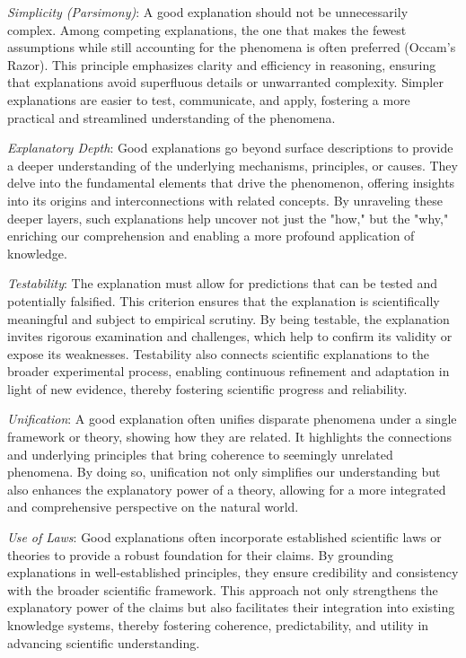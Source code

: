 \emph{Simplicity (Parsimony)}: A good explanation should not be unnecessarily complex. Among competing explanations, the one that makes the fewest assumptions while still accounting for the phenomena is often preferred (Occam’s Razor). This principle emphasizes clarity and efficiency in reasoning, ensuring that explanations avoid superfluous details or unwarranted complexity. Simpler explanations are easier to test, communicate, and apply, fostering a more practical and streamlined understanding of the phenomena.

\emph{Explanatory Depth}: Good explanations go beyond surface descriptions to provide a deeper understanding of the underlying mechanisms, principles, or causes. They delve into the fundamental elements that drive the phenomenon, offering insights into its origins and interconnections with related concepts. By unraveling these deeper layers, such explanations help uncover not just the "how," but the "why," enriching our comprehension and enabling a more profound application of knowledge.

\emph{Testability}: The explanation must allow for predictions that can be tested and potentially falsified. This criterion ensures that the explanation is scientifically meaningful and subject to empirical scrutiny. By being testable, the explanation invites rigorous examination and challenges, which help to confirm its validity or expose its weaknesses. Testability also connects scientific explanations to the broader experimental process, enabling continuous refinement and adaptation in light of new evidence, thereby fostering scientific progress and reliability.

\emph{Unification}: A good explanation often unifies disparate phenomena under a single framework or theory, showing how they are related. It highlights the connections and underlying principles that bring coherence to seemingly unrelated phenomena. By doing so, unification not only simplifies our understanding but also enhances the explanatory power of a theory, allowing for a more integrated and comprehensive perspective on the natural world.

\emph{Use of Laws}: Good explanations often incorporate established scientific laws or theories to provide a robust foundation for their claims. By grounding explanations in well-established principles, they ensure credibility and consistency with the broader scientific framework. This approach not only strengthens the explanatory power of the claims but also facilitates their integration into existing knowledge systems, thereby fostering coherence, predictability, and utility in advancing scientific understanding.

